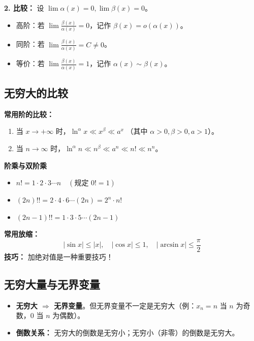 \documentclass[a4paper,12pt]{ctexart} %
\newenvironment{rednote}
  {\begin{tcolorbox}[colback=notepurple, colframe=highlightred, boxrule=1pt, title=\textbf{手写笔记补充}]}
  {\end{tcolorbox}}
\begin{document}
\textbf{2. 比较：} 设 $\lim \alpha(x) = 0, \lim \beta(x) = 0$。
\begin{itemize}
    \item 高阶：若 $\lim \frac{\beta(x)}{\alpha(x)} = 0$，记作 $\beta(x) = o(\alpha(x))$。
    \item 同阶：若 $\lim \frac{\beta(x)}{\alpha(x)} = C \neq 0$。
    \item 等价：若 $\lim \frac{\beta(x)}{\alpha(x)} = 1$，记作 $\alpha(x) \sim \beta(x)$。
\end{itemize}

\subsection{无穷大的比较}
\textbf{常用阶的比较：}
\begin{enumerate}
    \item 当 $x \to +\infty$ 时，$\ln^\alpha x \ll x^\beta \ll a^x$ （其中 $\alpha > 0, \beta > 0, a > 1$）。
    \item 当 $n \to \infty$ 时，$\ln^\alpha n \ll n^\beta \ll a^n \ll n! \ll n^n$。
\end{enumerate}

\begin{rednote}
    \textbf{阶乘与双阶乘}
    \begin{itemize}
        \item $n! = 1 \cdot 2 \cdot 3 \cdots n \quad (\text{规定 } 0! = 1)$
        \item $(2n)!! = 2 \cdot 4 \cdot 6 \cdots (2n) = 2^n \cdot n!$
        \item $(2n-1)!! = 1 \cdot 3 \cdot 5 \cdots (2n-1)$
    \end{itemize}
    \textbf{常用放缩：}
    \[ |\sin x| \leqslant |x|, \quad |\cos x| \leqslant 1, \quad |\arcsin x| \leqslant \frac{\pi}{2} \]
    \textbf{技巧：} 加绝对值是一种重要技巧！
\end{rednote}

\subsection{无穷大量与无界变量}
\begin{itemize}
    \item \textbf{无穷大 $\Rightarrow$ 无界变量}。但无界变量不一定是无穷大（例：$x_n = n$ 当 $n$ 为奇数，$0$ 当 $n$ 为偶数）。
    \item \textbf{倒数关系：} 无穷大的倒数是无穷小；无穷小（非零）的倒数是无穷大。
\end{itemize}
\end{document}
